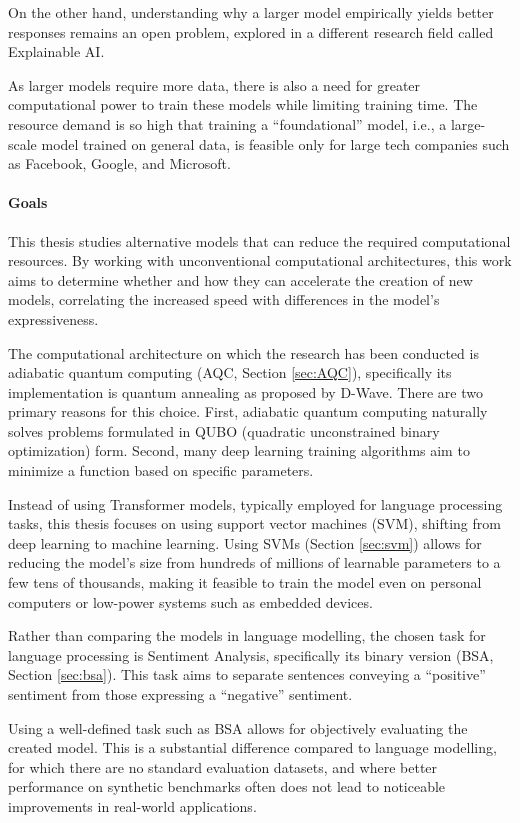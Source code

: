 On the other hand, understanding why a larger model empirically yields better responses remains an open problem, explored in a different research field called Explainable AI.

As larger models require more data, there is also a need for greater computational power to train these models while limiting training time.
The resource demand is so high that training a ``foundational'' model, i.e., a large-scale model trained on general data, is feasible only for large tech companies such as Facebook, Google, and Microsoft.

\paragraph{Goals} This thesis studies alternative models that can reduce the required computational resources.
By working with unconventional computational architectures, this work aims to determine whether and how they can accelerate the creation of new models, correlating the increased speed with differences in the model's expressiveness.

The computational architecture on which the research has been conducted is adiabatic quantum computing (AQC, Section \ref{sec:AQC}), specifically its implementation is quantum annealing as proposed by D-Wave.
There are two primary reasons for this choice. 
First, adiabatic quantum computing naturally solves problems formulated in QUBO (quadratic unconstrained binary optimization) form.
Second, many deep learning training algorithms aim to minimize a function based on specific parameters.

Instead of using Transformer models, typically employed for language processing tasks, this thesis focuses on using support vector machines (SVM), shifting from deep learning to machine learning. 
Using SVMs (Section \ref{sec:svm}) allows for reducing the model's size from hundreds of millions of learnable parameters to a few tens of thousands, making it feasible to train the model even on personal computers or low-power systems such as embedded devices.

Rather than comparing the models in language modelling, the chosen task for language processing is Sentiment Analysis, specifically its binary version (BSA, Section \ref{sec:bsa}).
This task aims to separate sentences conveying a ``positive'' sentiment from those expressing a ``negative'' sentiment.

Using a well-defined task such as BSA allows for objectively evaluating the created model.
This is a substantial difference compared to language modelling, for which there are no standard evaluation datasets, and where better performance on synthetic benchmarks often does not lead to noticeable improvements in real-world applications.


